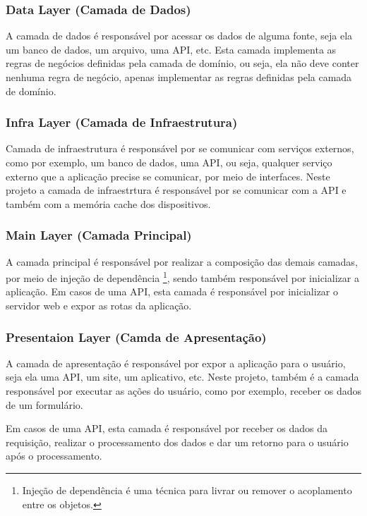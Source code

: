 \documentclass[12pt]{article}
\begin{document}
\subsubsection{Data Layer (Camada de Dados)}
\label{dataLayer}
A camada de dados é responsável por acessar os dados de alguma fonte, seja ela um banco de dados, um arquivo, uma API, etc.
Esta camada implementa as regras de negócios definidas pela camada de domínio, ou seja, ela não deve conter nenhuma regra de negócio, apenas implementar as regras definidas pela camada de domínio.

\subsubsection{Infra Layer (Camada de Infraestrutura)}
\label{infraLayer}
Camada de infraestrutura é responsável por se comunicar com serviços externos, como por exemplo, um banco de dados, uma API, ou seja, qualquer serviço externo que a aplicação precise se comunicar, por meio de interfaces. Neste projeto a camada de infraestrtura é responsável por se comunicar com a API e também com a memória cache dos dispositivos.

\subsubsection{Main Layer (Camada Principal)}
\label{mainLayer}
A camada principal é responsável por realizar a composição das demais camadas, por meio de injeção de dependência \footnote{Injeção de dependência é uma técnica para livrar ou remover o acoplamento entre os objetos.}, sendo também responsável por inicializar a aplicação. Em casos de uma API, esta camada é responsável por inicializar o servidor web e expor as rotas da aplicação.

\subsubsection{Presentaion Layer (Camda de Apresentação)}
\label{presentantionLayer}
A camada de apresentação é responsável por expor a aplicação para o usuário, seja ela uma API, um site, um aplicativo, etc. Neste projeto, também é a camada responsável por executar as ações do usuário, como por exemplo, receber os dados de um formulário. 

Em casos de uma API, esta camada é responsável por receber os dados da requisição, realizar o processamento dos dados e dar um retorno para o usuário após o processamento.
\end{document}
